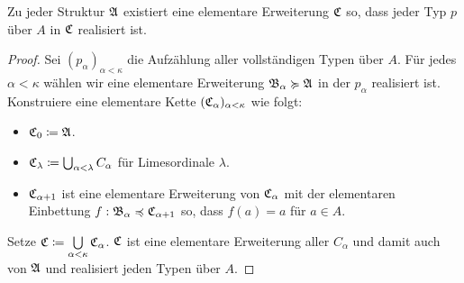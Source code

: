 \begin{satz}
	Zu jeder Struktur $\mathfrak{A}$ existiert eine elementare Erweiterung $\mathfrak{C}$ so, dass jeder Typ $p$ über $A$ in $\mathfrak{C}$ realisiert ist.
\end{satz}
\begin{proof}
	Sei $(p_\alpha)_{\alpha<\kappa}$ die Aufzählung aller vollständigen Typen über $A$. Für jedes $\alpha<\kappa$ wählen wir eine elementare Erweiterung $\mathfrak{B}_\alpha\succcurlyeq\mathfrak{A}$ in der $p_\alpha$ realisiert ist.
	Konstruiere eine elementare Kette $(\mathfrak{C}_\alpha)_{\alpha<\kappa}$ wie folgt:
	\begin{itemize}
		\item $\mathfrak{C}_0\coloneqq\mathfrak{A}$.
		\item $\mathfrak{C}_\lambda\coloneqq\bigcup_{\alpha<\lambda}C_\alpha$ für Limesordinale $\lambda$.
		\item $\mathfrak{C}_{\alpha+1}$ ist eine elementare Erweiterung von $\mathfrak{C}_\alpha$ mit der elementaren Einbettung $f:\mathfrak{B}_\alpha\preccurlyeq\mathfrak{C}_{\alpha+1}$ so, dass $f(a)=a$ für $a\in A$.
	\end{itemize}
	Setze $\mathfrak{C}\coloneqq\bigcup\limits_{\alpha<\kappa}\mathfrak{C}_\alpha$. $\mathfrak{C}$ ist eine elementare Erweiterung aller $C_\alpha$ und damit auch von $\mathfrak{A}$ und realisiert jeden Typen über $A$.
\end{proof}

